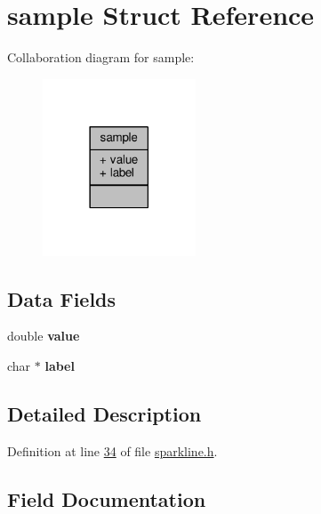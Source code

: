 \hypertarget{structsample}{}\section{sample Struct Reference}
\label{structsample}


Collaboration diagram for sample\+:\nopagebreak
\begin{figure}[H]
\begin{center}
\leavevmode
\includegraphics[width=129pt]{structsample__coll__graph}
\end{center}
\end{figure}
\subsection*{Data Fields}
\begin{DoxyCompactItemize}
\item 
\mbox{\label{structsample_a51254f3a30c9fb41161471af0124b738}} 
double {\bfseries value}
\item 
\mbox{\label{structsample_a71482266a61126eab8d0ab33633c2fa1}} 
char $\ast$ {\bfseries label}
\end{DoxyCompactItemize}


\subsection{Detailed Description}


Definition at line \hyperlink{sparkline_8h_source_l00034}{34} of file \hyperlink{sparkline_8h_source}{sparkline.\+h}.



\subsection{Field Documentation}
\mbox{\label{structsample_a71482266a61126eab8d0ab33633c2fa1}} 
